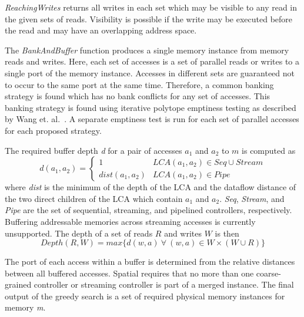 \emph{ReachingWrites} returns all writes in each set which may be visible to any read in the given sets of reads. Visibility is possible if the write may be executed before the read and may have an overlapping address space.

The \emph{BankAndBuffer} function produces a single memory instance from memory reads and writes.
Here, each set of accesses is a set of parallel reads or writes to a single port of the memory instance.
Accesses in different sets are guaranteed not to occur to the same port at the same time.
Therefore, a common banking strategy is found which has no bank conflicts for any set of accesses.
This banking strategy is found using iterative polytope emptiness testing as described by Wang et. al.~\cite{Wang_banking}.
A separate emptiness test is run for each set of parallel accesses for each proposed strategy.

The required buffer depth \emph{d} for a pair of accesses $a_1$ and $a_2$ to $m$ is computed as
\[
d(a_1, a_2) = \left\{\begin{matrix} 1 & LCA(a_1, a_2) \in Seq \cup Stream \\ dist(a_1,a_2) & LCA(a_1,a_2) \in Pipe \end{matrix}\right.
\]
where \emph{dist} is the minimum of the depth of the LCA and the dataflow distance of the two direct children of the LCA which contain $a_1$ and $a_2$. \emph{Seq}, \emph{Stream}, and \emph{Pipe} are the set of sequential, streaming, and pipelined controllers, respectively. Buffering addressable memories across streaming accesses is currently unsupported.
The depth of a set of reads $R$ and writes $W$ is then
\[ Depth(R,W) = max\{ d(w,a)~\forall ~(w,a) \in W \times (W\cup R) \} \]

The port of each access within a buffer is determined from the relative distances between all buffered accesses.
Spatial requires that no more than one coarse-grained controller or streaming controller is part of a merged instance.
The final output of the greedy search is a set of required physical memory instances for memory \emph{m}.
